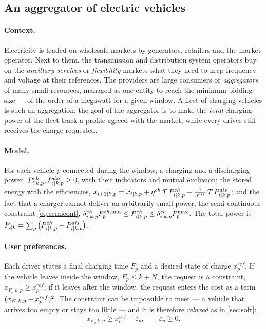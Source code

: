\subsection{An aggregator of electric vehicles}
\label{sec:aggregator}

\paragraph{Context.} Electricity is traded on wholesale markets by generators, retailers and
the market operator. Next to them, the transmission and distribution system operators buy on
the \emph{ancillary services} or \emph{flexibility} markets what they need to keep frequency
and voltage at their references. The providers are large consumers or \emph{aggregators} of
many small resources, managed as one entity to reach the minimum bidding size --- of the order
of a megawatt for a given window. A fleet of charging vehicles is such an aggregation: the goal
of the aggregator is to make the \emph{total} charging power of the fleet track a profile agreed
with the market, while every driver still receives the charge requested.

\paragraph{Model.} For each vehicle $p$ connected during the window, a charging and a
discharging power, $P^{ch}_{{i|k},p}, P^{dis}_{{i|k},p} \ge 0$, with their indicators and
mutual exclusion; the stored energy with the efficiencies,
$x_{{i+1|k},p} = x_{{i|k},p} + \eta^{ch}\,T\,P^{ch}_{{i|k},p} - \tfrac{1}{\eta^{dis}}\,T\,P^{dis}_{{i|k},p}$;
and the fact that a charger cannot deliver an arbitrarily small power, the semi-continuous
constraint \eqref{eq:semicont}, $\delta^{ch}_{{i|k},p}P^{ch,\min}_p \le P^{ch}_{{i|k},p} \le
\delta^{ch}_{{i|k},p}P^{\max}_p$. The total power is $P_{{i|k}} = \sum_p \big(P^{ch}_{{i|k},p}
- P^{dis}_{{i|k},p}\big)$.

\paragraph{User preferences.} Each driver states a final charging time $F_p$ and a desired
state of charge $x^{ref}_p$. If the vehicle leaves inside the window, $F_p \le k + N$, the
request is a constraint, $x_{F_p|k,p} \ge x^{ref}_p$; if it leaves after the window, the request
enters the cost as a term $(x_{{N|k},p} - x^{ref}_p)^2$. The constraint can be impossible to
meet --- a vehicle that arrives too empty or stays too little --- and it is therefore
\emph{relaxed} as in \cref{sec:soft}:
\begin{equation}
  x_{F_p|k,p} \ge x^{ref}_p - \varepsilon_p, \qquad \varepsilon_p \ge 0 .
\end{equation}


